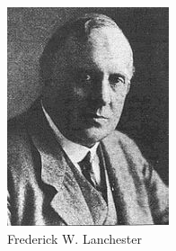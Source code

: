 \documentclass{article}
\begin{document}
\begin{center}
\begin{figure}[H]
\begin{minipage}[H]{0.25\linewidth}
	\centering
	\includegraphics[width=\textwidth]{../ressources/lanchester}
	\caption{Frederick W. Lanchester}
\end{minipage}
\hfill
\begin{minipage}[H]{0.25\linewidth}
	\centering

\end{minipage}
\end{figure}
\end{center}
\end{document}
